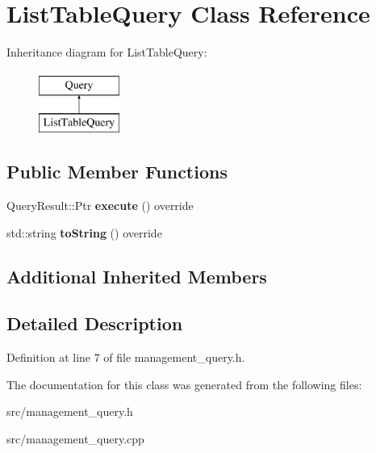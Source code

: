 \hypertarget{class_list_table_query}{}\section{List\+Table\+Query Class Reference}
\label{class_list_table_query}
Inheritance diagram for List\+Table\+Query\+:\begin{figure}[H]
\begin{center}
\leavevmode
\includegraphics[height=2.000000cm]{class_list_table_query}
\end{center}
\end{figure}
\subsection*{Public Member Functions}
\begin{DoxyCompactItemize}
\item 
\mbox{\label{class_list_table_query_a4f663e849be9eea9f3f1c055d478d143}} 
Query\+Result\+::\+Ptr {\bfseries execute} () override
\item 
\mbox{\label{class_list_table_query_ac58e1136af9a3304826fb03b7bde819b}} 
std\+::string {\bfseries to\+String} () override
\end{DoxyCompactItemize}
\subsection*{Additional Inherited Members}


\subsection{Detailed Description}


Definition at line 7 of file management\+\_\+query.\+h.



The documentation for this class was generated from the following files\+:\begin{DoxyCompactItemize}
\item 
src/management\+\_\+query.\+h\item 
src/management\+\_\+query.\+cpp\end{DoxyCompactItemize}
